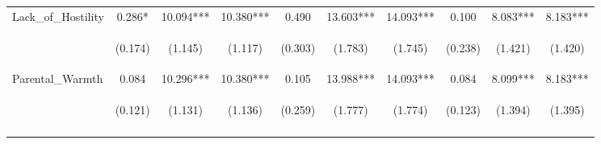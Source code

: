 \begin{tabular}{lccccccccc}
\noalign{\smallskip}Lack_of_Hostility & 0.286* & 10.094*** & 10.380*** & 0.490 & 13.603*** & 14.093*** & 0.100 & 8.083*** & 8.183***\\
 & \begin{footnotesize}(0.174)\end{footnotesize} & \begin{footnotesize}(1.145)\end{footnotesize} & \begin{footnotesize}(1.117)\end{footnotesize} & \begin{footnotesize}(0.303)\end{footnotesize} & \begin{footnotesize}(1.783)\end{footnotesize} & \begin{footnotesize}(1.745)\end{footnotesize} & \begin{footnotesize}(0.238)\end{footnotesize} & \begin{footnotesize}(1.421)\end{footnotesize} & \begin{footnotesize}(1.420)\end{footnotesize}\\
\noalign{\smallskip}Parental_Warmth & 0.084 & 10.296*** & 10.380*** & 0.105 & 13.988*** & 14.093*** & 0.084 & 8.099*** & 8.183***\\
 & \begin{footnotesize}(0.121)\end{footnotesize} & \begin{footnotesize}(1.131)\end{footnotesize} & \begin{footnotesize}(1.136)\end{footnotesize} & \begin{footnotesize}(0.259)\end{footnotesize} & \begin{footnotesize}(1.777)\end{footnotesize} & \begin{footnotesize}(1.774)\end{footnotesize} & \begin{footnotesize}(0.123)\end{footnotesize} & \begin{footnotesize}(1.394)\end{footnotesize} & \begin{footnotesize}(1.395)\end{footnotesize}\\
\noalign{\smallskip}\hline\end{tabular}\\
